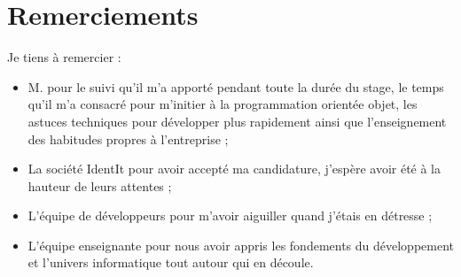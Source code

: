 \chapter*{Remerciements} %

Je tiens à remercier :
\begin{itemize}
\item M. pour le suivi qu'il m'a apporté pendant toute la durée du
stage, le temps qu'il m'a consacré pour m'initier à la programmation orientée
objet, les astuces techniques pour développer plus rapidement ainsi que
l'enseignement des habitudes propres à l'entreprise ;
\item La société IdentIt pour avoir accepté ma candidature, j'espère avoir
été à la hauteur de leurs attentes ;
\item L'équipe de développeurs pour m'avoir aiguiller quand j'étais en
détresse ;
\item L'équipe enseignante pour nous avoir appris les fondements du
développement et l'univers informatique tout autour qui en découle.
\end{itemize}
